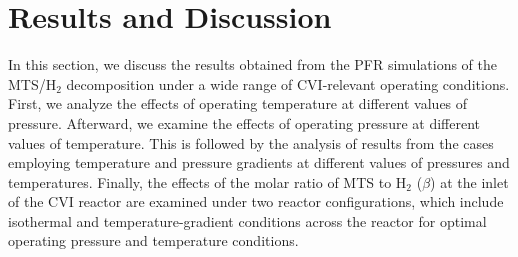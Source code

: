 \documentclass[final, letterpaper, square, comma, numbers, sort&compress]{elsarticle}
\begin{document}
\section{Results and Discussion}
\label{S:4}
In this section, we discuss the results obtained from the PFR simulations of the MTS/H$_2$ decomposition under a wide range of CVI-relevant operating conditions. First, we analyze the effects of operating temperature at different values of pressure. Afterward, we examine the effects of operating pressure at different values of temperature. This is followed by the analysis of results from the cases employing temperature and pressure gradients at different values of pressures and temperatures. Finally, the effects of the molar ratio of MTS to H$_2$ ($\beta$) at the inlet of the CVI reactor are examined under two reactor configurations, which include isothermal and temperature-gradient conditions across the reactor for optimal operating pressure and temperature conditions.
\end{document}
